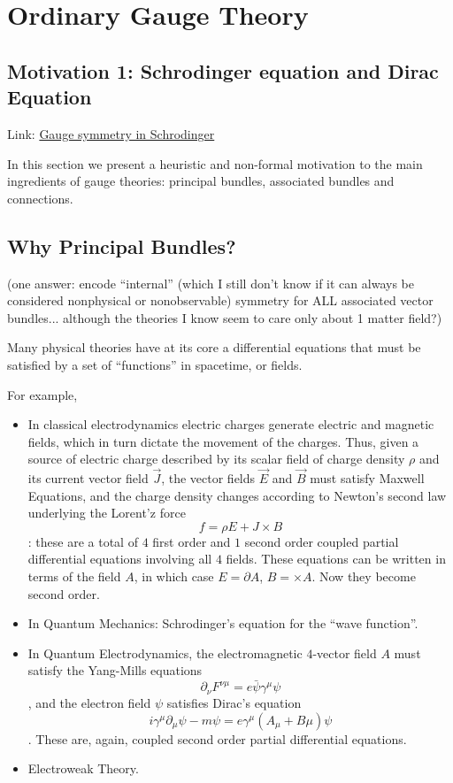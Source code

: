 \section{Ordinary Gauge Theory}

\subsection{Motivation 1: Schrodinger equation and Dirac Equation}

Link: \href{https://quantummechanics.ucsd.edu/ph130a/130_notes/node296.html}{Gauge symmetry in Schrodinger}

In this section we present a heuristic and non-formal motivation to the main ingredients of gauge theories: principal bundles, associated bundles and connections.

\subsection{Why Principal Bundles?}

(one answer: encode ``internal'' (which I still don't know if it can always be considered nonphysical or nonobservable) symmetry for ALL associated vector bundles... although the theories I know seem to care only about 1 matter field?)

Many physical theories have at its core a differential equations that must be satisfied by a set of ``functions'' in spacetime, or fields. 

For example, 

\begin{itemize}
    \item In classical electrodynamics electric charges generate electric and magnetic fields, which in turn dictate the movement of the charges. Thus, given a source of electric charge described by its scalar field of charge density $\rho$ and its current vector field $\vec J$, the vector fields $\vec E$ and $\vec B$ must satisfy Maxwell Equations, and the charge density changes according to Newton's second law underlying the Lorent'z force \[f = \rho E + J \times B\]: these are a total of $4$ first order and $1$ second order coupled partial differential equations involving all $4$ fields. These equations can be written in terms of the field $A$, in which case $E = \partial A$, $B = \times A$. Now they become second order.
    
    \item In Quantum Mechanics: Schrodinger's equation for the ``wave function''.
    
    \item In Quantum Electrodynamics, the electromagnetic $4$-vector field $A$ must satisfy the Yang-Mills equations \[\partial_\nu F^{\nu \mu} = e \bar \psi \gamma^\mu \psi\], and the electron field $\psi$ satisfies Dirac's equation \[i \gamma^\mu \partial_\mu \psi - m\psi = e \gamma^\mu (A_\mu + B\mu) \psi\]. These are, again, coupled second order partial differential equations.
    
    \item Electroweak Theory. 
\end{itemize}

